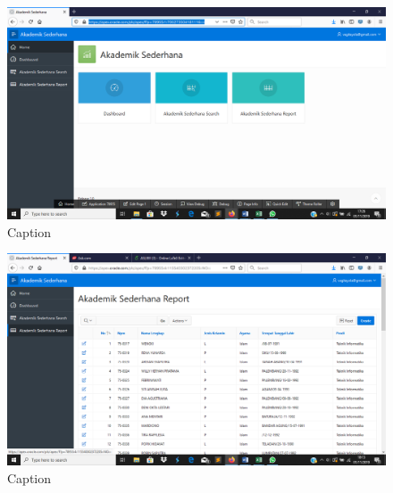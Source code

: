 \begin{enumerate}
\begin{figure}[!htbp]
    \centering
    \includegraphics[scale=0.3]{figure/20.png}
    \caption{Caption}
    \label{fig:my_label}
\end{figure}
\begin{figure}[!htbp]
    \centering
    \includegraphics[scale=0.3]{figure/21.png}
    \caption{Caption}
    \label{fig:my_label}
\end{figure}
\end{enumerate}


